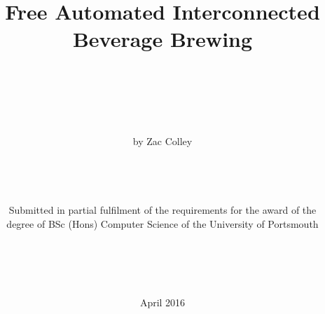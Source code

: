 \title{\bfseries Free Automated Interconnected Beverage Brewing}
\author{\\\\\\\\\\by Zac Colley\\\\\\\\\\Submitted in partial fulfilment of the requirements for the award of the\\ degree of BSc (Hons) Computer Science of the University of Portsmouth\\\\\\\\\\}
\date{April 2016}